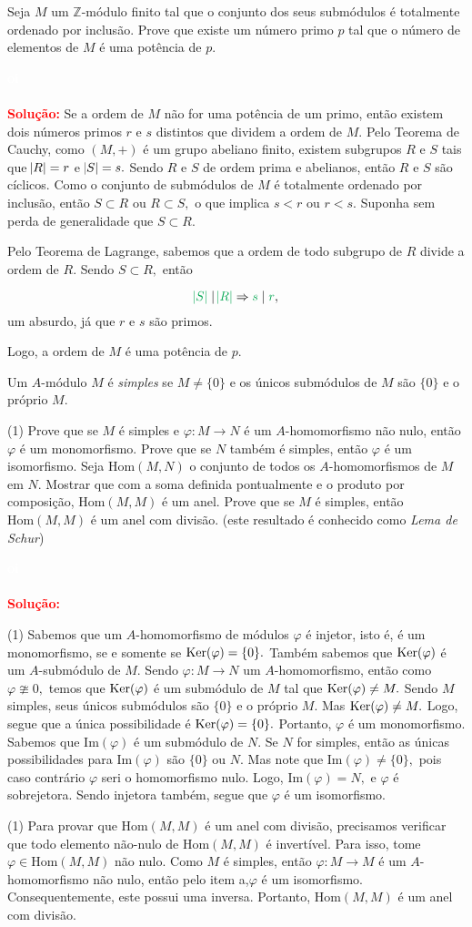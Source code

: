 \documentclass[11pt,a4paper]{article}
\newcounter{exercicio}[section]
\newcommand{\dividiritens}[1]{\begin{tasks}[counter-format={(tsk[a])},label-width=3.6ex, label-format = {\bfseries}, column-sep = {0pt}](1) #1 \end{tasks}}
\newcommand{\pers}[1]{\textcolor{Floresta}{$\negrito{(#1)} $}}
\newcommand{\solucao}[1]{
\textbf{\textcolor{white}{oi}\\ \\ \textcolor{red}{Solução:}} #1}
\begin{document}
 Seja $M$ um $\mathbb{Z}$-módulo finito tal que o conjunto dos seus submódulos é totalmente ordenado por
inclusão. Prove que existe um número primo $p$ tal que o número de elementos de $M$ é uma potência de $p.$
\solucao{
Se a ordem de $M$ não for uma potência de um primo, então existem dois números primos $r$ e $s$ distintos que dividem a ordem de $M.$ Pelo Teorema de Cauchy, como $(M, +)$ é um grupo abeliano finito, existem subgrupos $R$ e $S$ tais que $\abs{R} = r$ e $\abs{S} = s.$ Sendo $R$ e $S$ de ordem prima e abelianos, então $R$ e $S$ são cíclicos. Como o conjunto de submódulos de $M$ é totalmente ordenado por inclusão, então $S \subset R$ ou $R \subset S,$ o que implica $s < r$ ou $r < s.$ Suponha sem perda de generalidade que $S \subset R.$ 

Pelo Teorema de Lagrange, sabemos que a ordem de todo subgrupo de $R$ divide a ordem de $R.$ Sendo $S \subset R,$ então 

\[\textcolor{Green}{\abs{S}} \mid \textcolor{Green}{\abs{R}} \Rightarrow \textcolor{Green}{s} \mid \textcolor{Green}{r},\]
um absurdo, já que $r$ e $s$ são primos.

Logo, a ordem de $M$ é uma potência de $p.$
}
 Um $A$-módulo $M$ é \emph{simples} se $M \neq \{0\}$ e os únicos submódulos de $M$ são $\{ 0\}$ e o próprio $M.$
\dividiritens{
\task[\pers{a}] Prove que se $M$ é simples e $\varphi \colon M \to N$ é um $A$-homomorfismo não nulo, então $\varphi$ é um
monomorfismo. Prove que se $N$ também é simples, então $\varphi$ é um isomorfismo.
\task[\pers{b}]  Seja $\mbox{Hom}(M, N)$ o conjunto de todos os $A$-homomorfismos de $M$ em $N.$ Mostrar que com a
soma definida pontualmente e o produto por composição, $\mbox{Hom}(M, M)$ é um anel. Prove que se $M$ é simples, então $\mbox{Hom}(M, M)$ é um anel com divisão. (este resultado é conhecido como
\emph{Lema de Schur})
}
\solucao{
\dividiritens{
\task[\pers{a}] Sabemos que um $A$-homomorfismo de módulos $\varphi$ é injetor, isto é, é um monomorfismo, se e somente se ${\rm Ker}(\varphi) = \{ 0 \}.$ Também sabemos que ${\rm Ker}(\varphi)$ é um $A$-submódulo de $M.$ Sendo $\varphi \colon M \to N$ um $A$-homomorfismo, então como $\varphi \ncong 0,$ temos que ${\rm Ker}(\varphi)$ é um submódulo de $M$ tal que ${\rm Ker}(\varphi) \neq M.$ Sendo $M$ simples, seus únicos submódulos são $\{ 0\}$ e o próprio $M.$ Mas ${\rm Ker}(\varphi) \neq M.$ Logo, segue que a única possibilidade é ${\rm Ker}(\varphi) = \{ 0 \}.$ Portanto, $\varphi$ é um monomorfismo.
Sabemos que $\mbox{Im}(\varphi)$ é um submódulo de $N.$ Se $N$ for simples, então as únicas possibilidades para $\mbox{Im}(\varphi)$ são $\{ 0 \}$ ou $N.$ Mas note que $\mbox{Im}(\varphi) \neq \{ 0 \},$ pois caso contrário $\varphi$ seri o homomorfismo nulo. Logo, $\mbox{Im}(\varphi) = N,$ e $\varphi$ é sobrejetora. Sendo injetora também, segue que $\varphi$ é um isomorfismo.
}
\dividiritens{
\task[\pers{b}] Para provar que $\mbox{Hom}(M, M)$ é um anel com divisão, precisamos verificar que todo elemento não-nulo de $\mbox{Hom}(M, M)$ é invertível. Para isso, tome $\varphi \in \mbox{Hom}(M, M)$ não nulo. Como $M$ é simples, então $\varphi \colon M \to M$ é um $A$-homomorfismo não nulo, então pelo item a,$\varphi$ é um isomorfismo. Consequentemente, este possui uma inversa. Portanto,  $\mbox{Hom}(M, M)$ é um anel com divisão.
}

}
\end{document}
